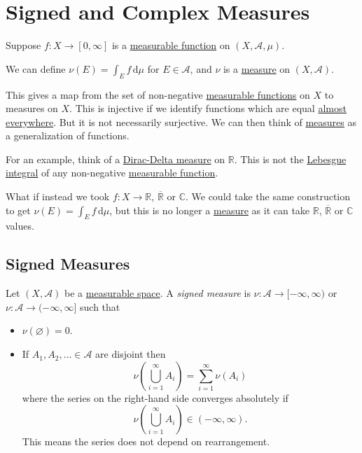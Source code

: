\chapter{Signed and Complex Measures}
\begin{prev}
	Suppose \(f \colon X \to [0,\infty]\) is a \hyperref[def:measurable-function]{measurable function} on \((X, \mathcal{A}, \mu)\).

	We can define \(\nu(E) = \int_E f \,\mathrm{d} \mu\)  for \(E \in \mathcal{A}\), and \(\nu\) is a \hyperref[def:measure]{measure} on \((X, \mathcal{A})\).

	This gives a map from the set of non-negative \hyperref[def:measurable-function]{measurable functions} on \(X\) to measures on \(X\). This is
	injective if we identify functions which are equal \hyperref[def:mu-almost-everywhere]{almost everywhere}. But it is not necessarily surjective.
	We can then think of \hyperref[def:measure]{measures} as a generalization of functions.

	For an example, think of a \hyperref[eg:Dirac-Delta measure]{Dirac-Delta measure} on \(\mathbb{R}\). This is not the \hyperref[def:integrable]{Lebesgue integral}
	of any non-negative \hyperref[def:measurable-function]{measurable function}.
\end{prev}

What if instead we took \(f \colon X \to \mathbb{R}\), \(\overline{\mathbb{R}}\) or \(\mathbb{C}\). We could take the same construction to get
\(\nu(E) = \int_E f \,\mathrm{d} \mu\), but this is no longer a \hyperref[def:measure]{measure} as it can take \(\mathbb{R}\), \(\overline{\mathbb{R}}\) or \(\mathbb{C}\) values.

\section{Signed Measures}
\begin{definition}\label{def:signed-measure}
	Let \((X, \mathcal{A})\) be a \hyperref[def:measurable-space]{measurable space}. A \emph{signed measure} is \(\nu \colon \mathcal{A} \to [-\infty,\infty)\) or
		\(\nu \colon \mathcal{A} \to (-\infty, \infty]\) such that
	\begin{itemize}
		\item \(\nu(\varnothing ) = 0\).
		\item If \(A_1,A_2,\ldots \in \mathcal{A}\) are disjoint then
		      \[
			      \nu\left( \bigcup_{i=1}^\infty A_i \right) = \sum_{i=1}^\infty \nu(A_i)
		      \]
		      where the series on the right-hand side converges absolutely if
		      \[
			      \nu\left( \bigcup_{i=1}^\infty A_{i} \right) \in (-\infty,\infty).
		      \]
		      This means the series does not depend on rearrangement.
	\end{itemize}
\end{definition}


